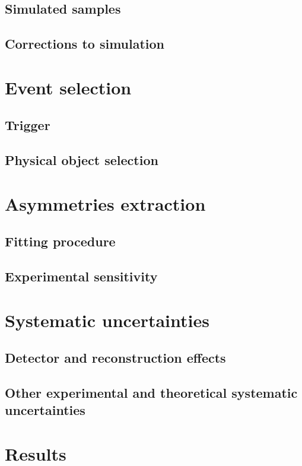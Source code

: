 \documentclass[10pt,a4paper,twoside]{report}
\begin{document}
    \section{Simulated samples}
    
    \section{Corrections to simulation}
    
\chapter{Event selection}
    \section{Trigger}
    
    \section{Physical object selection}
    
\chapter{Asymmetries extraction}\label{sec:fitresult}
    \section{Fitting procedure}
    
    \section{Experimental sensitivity}
    
\chapter{Systematic uncertainties}\label{sec:uncertainty}
    
    \section{Detector and reconstruction effects}
    
    \section{Other experimental and theoretical systematic uncertainties}
    
\chapter{Results}\label{sec:results}
\end{document}
